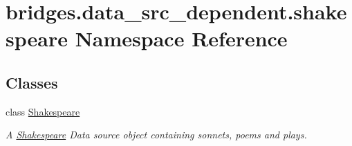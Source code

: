 \hypertarget{namespacebridges_1_1data__src__dependent_1_1shakespeare}{}\section{bridges.\+data\+\_\+src\+\_\+dependent.\+shakespeare Namespace Reference}
\label{namespacebridges_1_1data__src__dependent_1_1shakespeare}
\subsection*{Classes}
\begin{DoxyCompactItemize}
\item 
class \hyperlink{classbridges_1_1data__src__dependent_1_1shakespeare_1_1_shakespeare}{Shakespeare}
\begin{DoxyCompactList}\small\item\em A \hyperlink{classbridges_1_1data__src__dependent_1_1shakespeare_1_1_shakespeare}{Shakespeare} Data source object containing sonnets, poems and plays. \end{DoxyCompactList}\end{DoxyCompactItemize}
